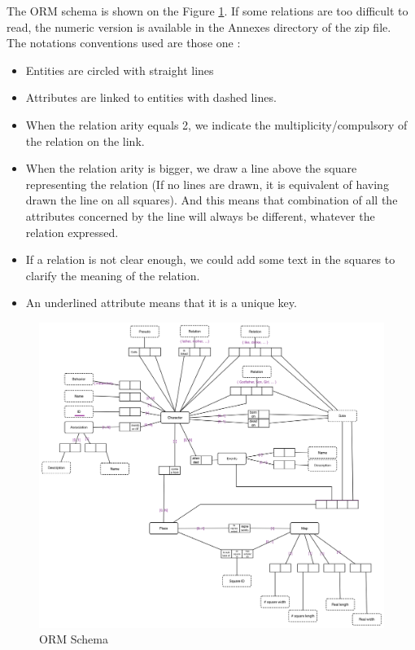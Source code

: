 \documentclass[a4paper ,12pt,french]{article}
\begin{document}
The ORM schema is shown on the Figure \ref{orm}. If some relations are too difficult to read, the numeric version is available in the Annexes directory of the zip file.\\ The notations conventions used are those one :
\begin{itemize}
\item Entities are circled with straight lines
\item Attributes are linked to entities with dashed lines.
\item When the relation arity equals 2, we indicate the multiplicity/compulsory of the relation on the link.
\item When the relation arity is bigger, we draw a line above the square representing the relation (If no lines are drawn, it is equivalent of having drawn the line on all squares). And this means that combination of all the attributes concerned by the line will always be different, whatever the relation expressed.
\item If a relation is not clear enough, we could add some text in the squares to clarify the meaning of the relation.
\item An underlined attribute means that it is a unique key.
\end{itemize}

\begin{figure}[!h]
\includegraphics[scale=0.43]{ORM.png}
\caption{ORM Schema}
\label{orm}
\end{figure}
\end{document}
